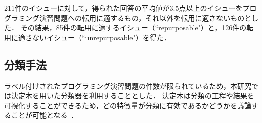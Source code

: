 
211件のイシューに対して，得られた回答の平均値が3.5点以上のイシューをプログラミング演習問題への転用に適するもの，それ以外を転用に適さないものとした．
その結果，85件の転用に適するイシュー（``repurposable"）と，126件の転用に適さないイシュー（``unrepurposable"）を得た．


\subsection{分類手法}
% 
ラベル付けされたプログラミング演習問題の件数が限られているため，本研究では決定木を用いた分類器を利用することとした．
決定木は分類の工程や結果を可視化することができるため，どの特徴量が分類に有効であるかどうかを議論することが可能となる~\cite{FRIEDL1997399}．


